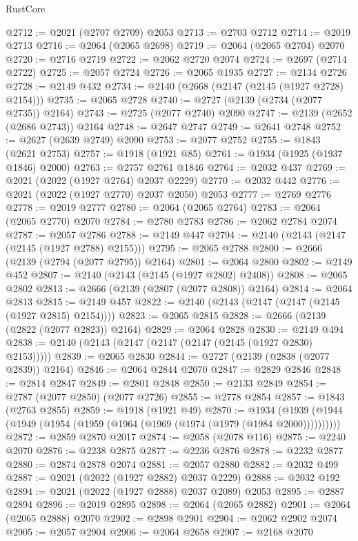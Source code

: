 \begin{lexlean}{RustCore}
\begin{coremodule}
@2712 := @2021 (@2707 @2709) @2053
@2713 := @2703 @2712
@2714 := @2019 @2713
@2716 := @2064 (@2065 @2698)
@2719 := @2064 (@2065 @2704) @2070
@2720 := @2716 @2719
@2722 := @2062 @2720 @2074
@2724 := @2697 (@2714 @2722)
@2725 := @2057 @2724
@2726 := @2065 @1935
@2727 := @2134 @2726
@2728 := @2149 @432
@2734 := @2140 (@2668 (@2147 (@2145 (@1927 @2728) @2154)))
@2735 := @2065 @2728
@2740 := @2727 (@2139 (@2734 (@2077 @2735)) @2164)
@2743 := @2725 (@2077 @2740) @2090
@2747 := @2139 (@2652 (@2686 @2743)) @2164
@2748 := @2647 @2747
@2749 := @2641 @2748
@2752 := @2627 (@2639 @2749) @2090
@2753 := @2077 @2752
@2755 := @1843 (@2621 @2753)
@2757 := @1918 (@1921 @85)
@2761 := @1934 (@1925 (@1937 @1846) @2000)
@2763 := @2757 @2761 @1846
@2764 := @2032 @437
@2769 := @2021 (@2022 (@1927 @2764) @2037 @2229)
@2770 := @2032 @442
@2776 := @2021 (@2022 (@1927 @2770) @2037 @2050) @2053
@2777 := @2769 @2776
@2778 := @2019 @2777
@2780 := @2064 (@2065 @2764)
@2783 := @2064 (@2065 @2770) @2070
@2784 := @2780 @2783
@2786 := @2062 @2784 @2074
@2787 := @2057 @2786
@2788 := @2149 @447
@2794 := @2140 (@2143 (@2147 (@2145 (@1927 @2788) @2155)))
@2795 := @2065 @2788
@2800 := @2666 (@2139 (@2794 (@2077 @2795)) @2164)
@2801 := @2064 @2800
@2802 := @2149 @452
@2807 := @2140 (@2143 (@2145 (@1927 @2802) @2408))
@2808 := @2065 @2802
@2813 := @2666 (@2139 (@2807 (@2077 @2808)) @2164)
@2814 := @2064 @2813
@2815 := @2149 @457
@2822 := @2140 (@2143 (@2147 (@2147 (@2145 (@1927 @2815) @2154))))
@2823 := @2065 @2815
@2828 := @2666 (@2139 (@2822 (@2077 @2823)) @2164)
@2829 := @2064 @2828
@2830 := @2149 @494
@2838 := @2140 (@2143 (@2147 (@2147 (@2147 (@2145 (@1927 @2830) @2153)))))
@2839 := @2065 @2830
@2844 := @2727 (@2139 (@2838 (@2077 @2839)) @2164)
@2846 := @2064 @2844 @2070
@2847 := @2829 @2846
@2848 := @2814 @2847
@2849 := @2801 @2848
@2850 := @2133 @2849
@2854 := @2787 (@2077 @2850) (@2077 @2726)
@2855 := @2778 @2854
@2857 := @1843 (@2763 @2855)
@2859 := @1918 (@1921 @49)
@2870 := @1934 (@1939 (@1944 (@1949 (@1954 (@1959 (@1964 (@1969 (@1974 (@1979 (@1984 @2000))))))))))
@2872 := @2859 @2870 @2017
@2874 := @2058 (@2078 @116)
@2875 := @2240 @2070
@2876 := @2238 @2875
@2877 := @2236 @2876
@2878 := @2232 @2877
@2880 := @2874 @2878 @2074
@2881 := @2057 @2880
@2882 := @2032 @499
@2887 := @2021 (@2022 (@1927 @2882) @2037 @2229)
@2888 := @2032 @192
@2894 := @2021 (@2022 (@1927 @2888) @2037 @2089) @2053
@2895 := @2887 @2894
@2896 := @2019 @2895
@2898 := @2064 (@2065 @2882)
@2901 := @2064 (@2065 @2888) @2070
@2902 := @2898 @2901
@2904 := @2062 @2902 @2074
@2905 := @2057 @2904
@2906 := @2064 @2658
@2907 := @2168 @2070

\end{coremodule}
\end{lexlean}
